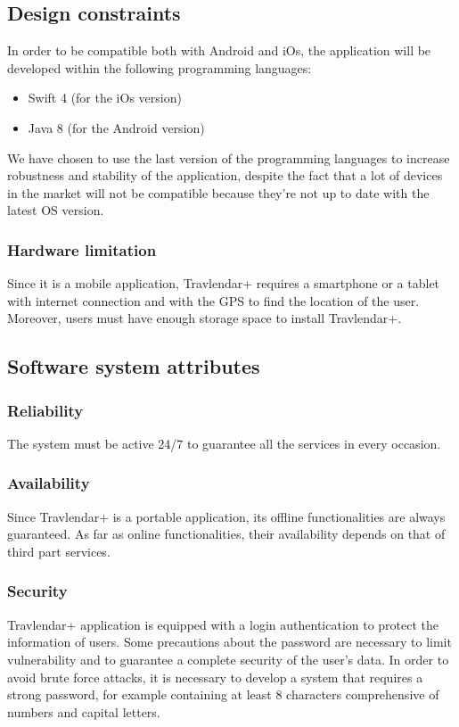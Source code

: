 \documentclass[12pt,titlepage]{article}
\begin{document}
\subsection{Design constraints}\label{sec:mod1}
In order to be compatible both with Android and iOs, the application will be developed within the following programming languages:
\begin{itemize}
\item Swift 4 (for the iOs version)
\item Java 8 (for the Android version)
\end{itemize}
We have chosen to use the last version of the programming languages to increase robustness and stability of the application, despite the fact that a lot of devices in the market will not be compatible because they're not up to date with the latest OS version.


\subsubsection{Hardware limitation}\label{sec:mod1}
Since it is a mobile application, Travlendar+ requires a smartphone or a tablet with internet connection and with the GPS to find the location of the user.
Moreover, users must have enough storage space to install Travlendar+. 


\subsection{Software system attributes}\label{sec:mod1}
\subsubsection{Reliability}\label{sec:mod1}
The system must be active 24/7 to guarantee all the services in every occasion. 

\subsubsection{Availability}\label{sec:mod1}
Since Travlendar+ is a portable application, its offline functionalities are always guaranteed. As far as online functionalities, their availability depends on that of third part services.
\subsubsection{Security}\label{sec:mod1}

Travlendar+ application is equipped with a login authentication to protect the information of users. Some precautions about the password are necessary to limit vulnerability and to guarantee a complete security of the user's data. In order to avoid brute force attacks, it is necessary to develop a system that requires a strong password, for example containing at least 8 characters comprehensive of numbers and capital letters. 
\end{document}

